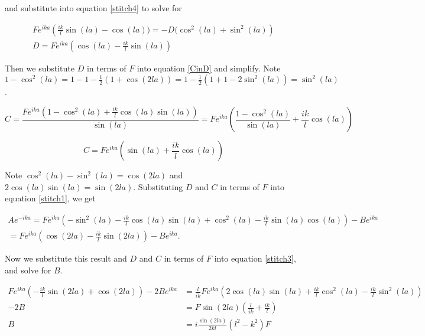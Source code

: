 \documentclass[letterpaper,12pt]{article}
\begin{document}
    and substitute into equation \eqref{stitch4} to solve for

    \begin{gather*}
        Fe^{ika}
        \left(
        \frac{ik}{l}\sin(la) - \cos(la)) = -D(\cos^2(la) + \sin^2(la)
        \right)
        \\
        D = Fe^{ika}
        \left(
        \cos(la) - \frac{ik}{l}\sin(la)
        \right)
    \end{gather*}

    Then we substitute $D$ in terms of $F$ into equation \eqref{CinD} and
    simplify. Note $1 - \cos^2(la) = 1 - 1 - \frac{1}{2}(1 + \cos(2la)) = 1 -
    \frac{1}{2}(1 + 1 - 2\sin^2(la)) = \sin^2(la)$.

    \[
        C
        = \frac{Fe^{ika}(1 - \cos^2(la) +
        \frac{ik}{l}\cos(la)\sin(la))}{\sin(la)}
        = Fe^{ika}
        \left(
        \frac{1 - \cos^2(la)}{\sin(la)} + \frac{ik}{l}\cos(la)
        \right)
    \]

    \[
        C = Fe^{ika}
        \left(
        \sin(la) + \frac{ik}{l}\cos(la)
        \right)
    \]

    Note $\cos^2(la) - \sin^2(la) = \cos(2la)$ and $2\cos(la)\sin(la) =
    \sin(2la)$. Substituting $D$ and $C$ in terms of $F$ into equation
    \eqref{stitch1}, we get

    \begin{gather}
        Ae^{-ika}
        = Fe^{ika}
        \left(
        -\sin^2(la) - \frac{ik}{l}\cos(la)\sin(la) + \cos^2(la)
        - \frac{ik}{l}\sin(la)\cos(la)
        \right)
        - Be^{ika}
        \nonumber
        \\
        = Fe^{ika}
        \left(
        \cos(2la) - \frac{ik}{l}\sin(2la)
        \right)
        - Be^{ika}. \label{AinFB}
    \end{gather}

    Now we substitute this result and $D$ and $C$ in terms of $F$ into equation
    \eqref{stitch3}, and solve for $B$.

    \begin{align*}
        Fe^{ika}
        \left(
        -\frac{ik}{l}\sin(2la) + \cos(2la)
        \right)
        - 2Be^{ika}
        &=
        \frac{l}{ik}Fe^{ika}
        \left(
        2\cos(la)\sin(la) + \frac{ik}{l}\cos^2(la) - \frac{ik}{l}\sin^2(la)
        \right)
        \\
        -2B &= F\sin(2la)
        \left(
        \frac{l}{ik} + \frac{ik}{l}
        \right)
        \\
        B &= i\frac{\sin(2la)}{2kl}(l^2 - k^2)F
    \end{align*}
\end{document}
